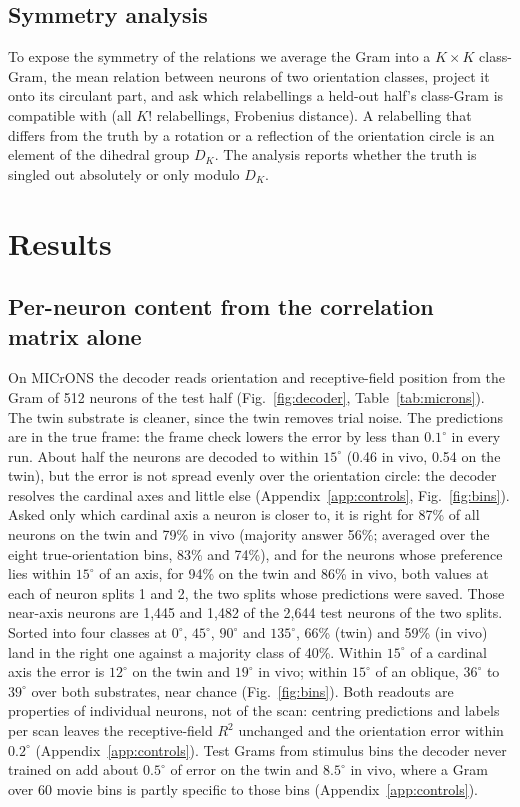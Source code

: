 \documentclass[11pt]{article}
\newcommand{\Rsq}{R^{2}}
\begin{document}
\subsection{Symmetry analysis}

To expose the symmetry of the relations we average the Gram into a $K\times K$ class-Gram, the mean relation between neurons of two orientation classes, project it onto its circulant part, and ask which relabellings a held-out half's class-Gram is compatible with (all $K!$ relabellings, Frobenius distance). A relabelling that differs from the truth by a rotation or a reflection of the orientation circle is an element of the dihedral group $D_K$. The analysis reports whether the truth is singled out absolutely or only modulo $D_K$.

\section{Results}

\subsection{Per-neuron content from the correlation matrix alone}\label{sec:main}

On MICrONS the decoder reads orientation and receptive-field position from the Gram of 512 neurons of the test half (Fig.~\ref{fig:decoder}, Table~\ref{tab:microns}). The twin substrate is cleaner, since the twin removes trial noise. The predictions are in the true frame: the frame check lowers the error by less than $0.1^\circ$ in every run. About half the neurons are decoded to within $15^\circ$ (0.46 in vivo, 0.54 on the twin), but the error is not spread evenly over the orientation circle: the decoder resolves the cardinal axes and little else (Appendix~\ref{app:controls}, Fig.~\ref{fig:bins}). Asked only which cardinal axis a neuron is closer to, it is right for 87\% of all neurons on the twin and 79\% in vivo (majority answer 56\%; averaged over the eight true-orientation bins, 83\% and 74\%), and for the neurons whose preference lies within $15^\circ$ of an axis, for 94\% on the twin and 86\% in vivo, both values at each of neuron splits 1 and 2, the two splits whose predictions were saved. Those near-axis neurons are 1,445 and 1,482 of the 2,644 test neurons of the two splits. Sorted into four classes at $0^\circ$, $45^\circ$, $90^\circ$ and $135^\circ$, 66\% (twin) and 59\% (in vivo) land in the right one against a majority class of 40\%. Within $15^\circ$ of a cardinal axis the error is $12^\circ$ on the twin and $19^\circ$ in vivo; within $15^\circ$ of an oblique, $36^\circ$ to $39^\circ$ over both substrates, near chance (Fig.~\ref{fig:bins}). Both readouts are properties of individual neurons, not of the scan: centring predictions and labels per scan leaves the receptive-field $\Rsq$ unchanged and the orientation error within $0.2^\circ$ (Appendix~\ref{app:controls}). Test Grams from stimulus bins the decoder never trained on add about $0.5^\circ$ of error on the twin and $8.5^\circ$ in vivo, where a Gram over 60 movie bins is partly specific to those bins (Appendix~\ref{app:controls}).
\end{document}
